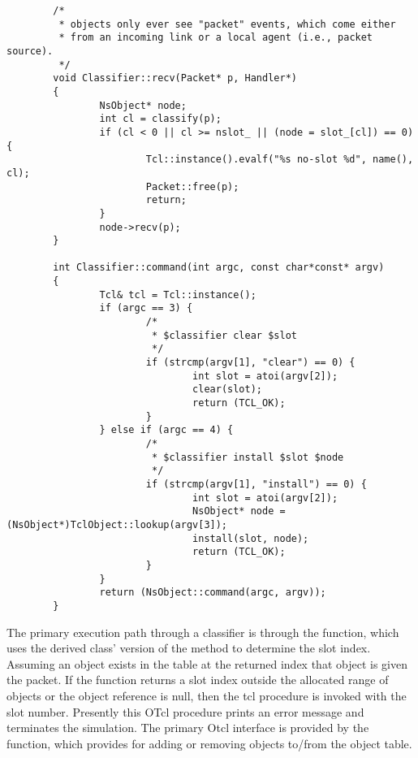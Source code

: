 \begin{small}
\begin{verbatim}
        /*
         * objects only ever see "packet" events, which come either
         * from an incoming link or a local agent (i.e., packet source).
         */
        void Classifier::recv(Packet* p, Handler*)
        {
                NsObject* node;
                int cl = classify(p);
                if (cl < 0 || cl >= nslot_ || (node = slot_[cl]) == 0) {
                        Tcl::instance().evalf("%s no-slot %d", name(), cl);
                        Packet::free(p);
                        return;
                }
                node->recv(p);
        }

        int Classifier::command(int argc, const char*const* argv)
        {
                Tcl& tcl = Tcl::instance();
                if (argc == 3) {
                        /*
                         * $classifier clear $slot
                         */
                        if (strcmp(argv[1], "clear") == 0) {
                                int slot = atoi(argv[2]);
                                clear(slot);
                                return (TCL_OK);
                        }
                } else if (argc == 4) {
                        /*
                         * $classifier install $slot $node
                         */
                        if (strcmp(argv[1], "install") == 0) {
                                int slot = atoi(argv[2]);
                                NsObject* node = (NsObject*)TclObject::lookup(argv[3]);
                                install(slot, node);
                                return (TCL_OK);
                        }
                }
                return (NsObject::command(argc, argv));
        }
\end{verbatim}
\end{small}
The primary execution path through a classifier is through the
 function, which uses the derived class' version of
the  method to determine the slot index.
Assuming an object exists in the table at the returned index that
object is given the packet.
If the  function returns a slot index outside
the allocated range of objects or the object reference is
null, then the tcl procedure  is invoked
with the slot number.
Presently this OTcl procedure prints an error message and terminates
the simulation.
The primary Otcl interface is provided by the  function,
which provides for adding or removing objects to/from the
object table.

